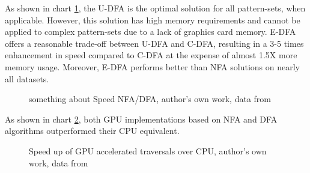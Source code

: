 \documentclass[10pt,onecolumn,twoside,english,a4paper]{article}
\begin{document}
As shown in chart \ref{speed NFA/DFA:becchi}, the U-DFA is the optimal solution for all pattern-sets, when applicable. However, this solution has high memory requirements and cannot be applied to complex pattern-sets due to a lack of graphics card memory.
E-DFA offers a reasonable trade-off between U-DFA and C-DFA, resulting in a 3-5 times enhancement in speed compared to C-DFA at the expense of almost 1.5X more memory usage. Moreover, E-DFA performs better than NFA solutions on nearly all datasets.

\begin{figure}[h!]
  \centering
  \begin{tikzpicture}

  \end{tikzpicture}
  \caption{something about Speed NFA/DFA, author's own work, data from \cite{Becchi:regex_large_dataset}}
  \label{speed NFA/DFA:becchi}
\end{figure}

As shown in chart \ref{speedup:becchi}, both GPU implementations based on NFA and DFA algorithms outperformed their CPU equivalent.

\begin{figure}[h!]
  \centering
  \caption{Speed up of GPU accelerated traversals over CPU, author's own work, data from \cite{Becchi:regex_large_dataset}}
  \label{speedup:becchi}
\end{figure}
\end{document}
